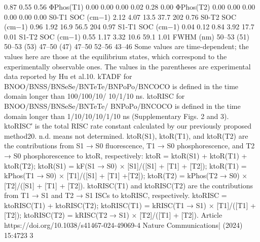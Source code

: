 0.87
0.55
0.56
ΦPhos(T1)
0.00
0.00
0.00
0.02
0.28
0.00
ΦPhos(T2)
0.00
0.00
0.00
0.00
0.00
0.00
S0-T1 SOC (cm−1)
2.12
4.07
13.5
37.7
202
0.76
S0-T2 SOC (cm−1)
0.96
1.92
16.9
56.5
204
0.97
S1-T1 SOC (cm−1)
0.04
0.12
0.84
3.92
17.7
0.01
S1-T2 SOC (cm−1)
0.55
1.17
3.32
10.6
59.1
1.01
FWHM (nm)
50–53
(51)
50–53
(53)
47–50
(47)
47–50
52–56
43–46
Some values are time-dependent; the values here are those at the equilibrium states, which correspond to the experimentally observable ones. The values in the parentheses are experimental data
reported by Hu et al.10. kTADF for BNOO/BNSS/BNSeSe/BNTeTe/BNPoPo/BNCOCO is deﬁned in the time domain longer than 100/100/10/ 10/1/10 ns. ktoRISC for BNOO/BNSS/BNSeSe/BNTeTe/
BNPoPo/BNCOCO is deﬁned in the time domain longer than 1/10/10/10/1/10 ns (Supplementary Figs. 2 and 3). ktoRISC′ is the total RISC rate constant calculated by our previously proposed method20.
n.d. means not determined. ktoR(S1), ktoR(T1), and ktoR(T2) are the contributions from S1 → S0 ﬂuorescence, T1 → S0 phosphorescence, and T2 → S0 phosphorescence to ktoR, respectively:
ktoR = ktoR(S1) + ktoR(T1) + ktoR(T2); ktoR(S1) = kF(S1 → S0) × [S1]/([S1] + [T1] + [T2]); ktoR(T1) = kPhos(T1 → S0) × [T1]/([S1] + [T1] +[T2]); ktoR(T2) = kPhos(T2 → S0) × [T2]/([S1] + [T1] + [T2]). ktoRISC(T1) and ktoRISC(T2) are the
contributions from T1 → S1 and T2 → S1 ISCs to ktoRISC, respectively. ktoRISC = ktoRISC(T1) + ktoRISC(T2); ktoRISC(T1) = kRISC(T1 → S1) × [T1]/([T1] + [T2]); ktoRISC(T2) = kRISC(T2 → S1) × [T2]/([T1] + [T2]).
Article
https://doi.org/10.1038/s41467-024-49069-4
Nature Communications|        (2024) 15:4723 
3


